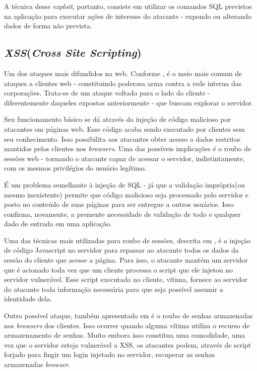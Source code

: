 			A técnica desse \textsl{exploit}, portanto, consiste em utilizar os comandos
			SQL previstos na aplicação para executar ações de interesse do atacante - expondo ou
			alterando dados de forma não prevista.

		\subsection{\textsl{XSS}(\textsl{Cross Site Scripting})}
			Um dos ataques mais difundidos na web. Conforme \cite{Dhanjani2009},
			é o meio mais comum de ataques a clientes web - constituindo poderosa arma
			contra a rede interna das corporações. Trata-se de um ataque voltado para o lado
			do cliente - diferentemente daqueles expostos anteriormente - que buscam explorar o servidor.


			Seu funcionamento básico se dá através da injeção de código malicioso por atacantes
			em páginas web. Esse código acaba sendo executado por clientes sem seu conhecimento.
			Isso possibilita aos atacantes obter acesso a dados restritos mantidos pelos clientes
			nos \textsl{browsers}. Uma das possíveis implicações é o roubo de sessões web - tornando
			o atacante capaz de acessar o servidor, indistintamente, com os mesmos privilégios
			do usuário legítimo.
			

			É um problema semelhante à injeção de SQL - já que a validação imprópria(ou mesmo inexistente)
			permite	que código malicioso seja processado pelo servidor e posto no conteúdo de suas páginas
			para ser entregue a outros usuários. Isso confirma, novamente, a premente necessidade de validação
			de todo e qualquer dado de entrada em uma aplicação. 

			
			Uma das técnicas mais utilizadas para roubo de sessões, descrita em \cite{Dhanjani2009}, é 
			a injeção de código Javascript no servidor para repassar ao atacante
			todos os dados da sessão do cliente que acesse a página. Para isso, o atacante mantém um servidor
			que é acionado toda vez que um cliente processa o script que ele injetou no servidor vulnerável.
			Esse script executado no cliente, vítima, fornece ao servidor do atacante toda informação
			necessária para que seja possível assumir a identidade dela.
			
			
			Outro possível ataque, também apresentado em \cite{Dhanjani2009} é o roubo de senhas armazenadas
			nos \textsl{browsers} dos clientes.	Isso ocorrer quando alguma vítima utiliza o recurso
			de armazenamento de senhas. Muito embora isso constitua uma comodidade, uma vez que o servidor
			esteja vulnerável a XSS, os atacantes podem, através de script forjado para fingir
			um login injetado no servidor, recuperar as senhas armazenadas \textsl{browser}. 


